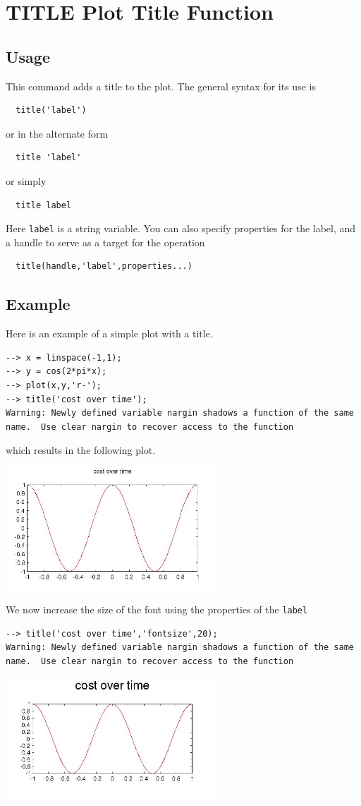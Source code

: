 \section{TITLE Plot Title Function}

\subsection{Usage}

This command adds a title to the plot.  The general syntax
for its use is
\begin{verbatim}
  title('label')
\end{verbatim}
or in the alternate form
\begin{verbatim}
  title 'label'
\end{verbatim}
or simply
\begin{verbatim}
  title label
\end{verbatim}
Here \verb|label| is a string variable.  You can also specify 
properties for the label, and a handle to serve as a target
for the operation
\begin{verbatim}
  title(handle,'label',properties...)
\end{verbatim}
\subsection{Example}

Here is an example of a simple plot with a title.
\begin{verbatim}
--> x = linspace(-1,1);
--> y = cos(2*pi*x);
--> plot(x,y,'r-');
--> title('cost over time');
Warning: Newly defined variable nargin shadows a function of the same name.  Use clear nargin to recover access to the function
\end{verbatim}
which results in the following plot.


\centerline{\includegraphics[width=8cm]{title1}}

We now increase the size of the font using the properties
of the \verb|label|
\begin{verbatim}
--> title('cost over time','fontsize',20);
Warning: Newly defined variable nargin shadows a function of the same name.  Use clear nargin to recover access to the function
\end{verbatim}


\centerline{\includegraphics[width=8cm]{title2}}

